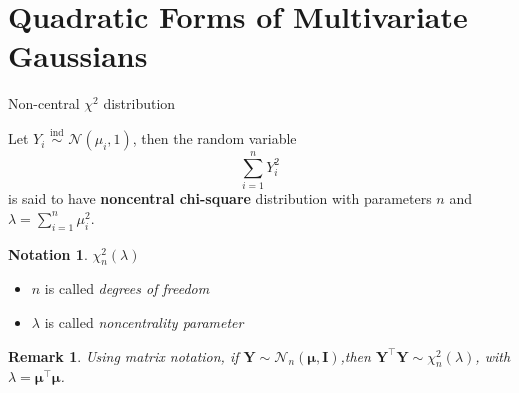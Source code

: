 \documentclass{beamer}
\newcommand{\Cov}{\mathrm{Cov}}
\newtheorem{notation}{Notation}
\newtheorem{remark}{Remark}
\begin{document}

\section{Quadratic Forms of Multivariate Gaussians}

\begin{frame}{Non-central $\chi^2$ distribution}
\begin{definition}
Let $Y_i\,\,{\stackrel{\text{ind}}{\sim}}\,\,\mathcal{N}(\mu_i,1)$, \pause then the random variable
$$
\sum_{i=1}^n Y_i^2
$$
is said to have \textbf{noncentral chi-square} distribution with parameters $n$ and $\lambda=\sum_{i=1}^n\mu_i^2$.
\end{definition}
\vspace{-10pt}
\pause \begin{notation}
$\chi^2_{n}(\lambda)$
\end{notation}
\begin{itemize}
    \item\pause $n$ is called \textit{degrees of freedom}
    \item\pause $\lambda$ is called \textit{noncentrality parameter}
\end{itemize}
\vspace{-10pt}
\pause\begin{remark} Using matrix notation, if $\mathbf{Y}\sim\mathcal{N}_n(\boldsymbol\mu,\mathbf{I})$,\pause then $\mathbf{Y}^\top\mathbf{Y}\sim\chi^2_n(\lambda)$, with $\lambda=\boldsymbol\mu^\top\boldsymbol\mu$.
\end{remark}
\end{frame}
\end{document}
